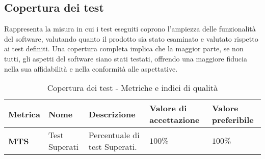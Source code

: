 \subsection{Copertura dei test}
Rappresenta la misura in cui i test eseguiti coprono l'ampiezza delle funzionalità del software, valutando quanto il prodotto sia stato esaminato e valutato rispetto ai test definiti. Una copertura completa implica che la maggior parte, se non tutti, gli aspetti del software siano stati testati, offrendo una maggiore fiducia nella sua affidabilità e nella conformità alle aspettative.  
\begin{table}[H]
    \centering
    \begin{tabular}{|C{1.5cm}|L{3cm}|L{4cm}|L{2.5cm}|L{2.5cm}|}
        \hline
        \textbf{Metrica} & \textbf{Nome} & \textbf{Descrizione} & \textbf{Valore di accettazione} & \textbf{Valore preferibile} \\
        \hline
        \textbf{MTS} & Test Superati & Percentuale di test Superati. & $ 100\%$ & $100\%$ \\
        \hline
    \end{tabular}
    \caption{Copertura dei test - Metriche e indici di qualità}
    \label{tab:copertura_qualita_prodotto}
\end{table}